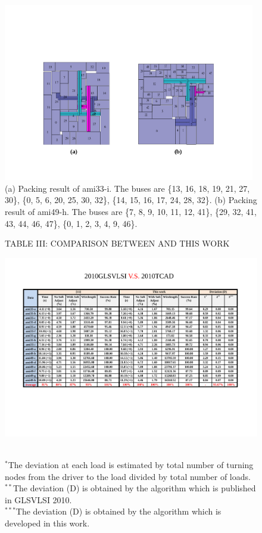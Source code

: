 \begin{figure}[htb]
  \centering
  \centerline{\includegraphics[width=11cm]{Fig/packing_result1.pdf}}
     \caption{
      (a) Packing result of ami33-i. The buses are \{13, 16, 18, 19, 21, 27, 30\}, \{0, 5, 6, 20, 25, 30, 32\},
                                                   \{14, 15, 16, 17, 24, 28, 32\}.
      (b) Packing result of ami49-h. The buses are \{7, 8, 9, 10, 11, 12, 41\}, \{29, 32, 41, 43, 44, 46, 47\},
                                                   \{0, 1, 2, 3, 4, 9, 46\}.
   }
  \label{fig::packing_result1}
\end{figure}

\begin{figure}[htb]
{
  \centering
  \scriptsize
   TABLE III: COMPARISON BETWEEN \cite{PH10} AND THIS WORK
    \centerline{\includegraphics[width=17cm]{Fig/table_3.pdf}}\\
    $^*$The deviation at each load is estimated by total number of turning nodes from the driver to the load divided by total number of loads.\\
    $^{**}$The deviation (D) is obtained by the algorithm which is published in GLSVLSI 2010.\\
    $^{***}$The deviation (D) is obtained by the algorithm which is developed in this work.\\
  \label{fig::table3}
}
\end{figure}

